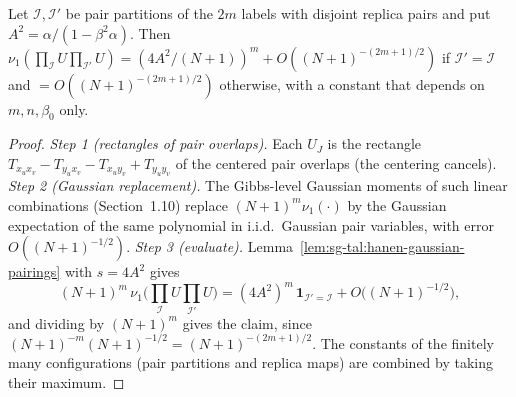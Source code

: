 \begin{lemma}\label{lem:sg-tal:hanen-full-pairings}
\leanok
{}
Let $\mathcal I,\mathcal I'$ be pair partitions of the $2m$ labels with disjoint replica pairs and put $A^2=\alpha/(1-\beta^2\alpha)$.
Then $\nu_1(\prod_{\mathcal I}U\prod_{\mathcal I'}U)=(4A^2/(N+1))^m+O((N+1)^{-(2m+1)/2})$ if $\mathcal I'=\mathcal I$ and
$=O((N+1)^{-(2m+1)/2})$ otherwise, with a constant that depends on $m,n,\beta_0$ only.
\end{lemma}
\begin{proof}
\leanok
\emph{Step 1 (rectangles of pair overlaps).} Each $U_J$ is the rectangle $T_{x_ux_v}-T_{y_ux_v}-T_{x_uy_v}+T_{y_uy_v}$ of the centered pair overlaps (the centering cancels).
\emph{Step 2 (Gaussian replacement).} The Gibbs-level Gaussian moments of such linear combinations (Section~1.10) replace $(N+1)^m\nu_1(\cdot)$ by the Gaussian expectation of the same polynomial in i.i.d.\ Gaussian pair variables, with error $O((N+1)^{-1/2})$.
\emph{Step 3 (evaluate).} Lemma~\ref{lem:sg-tal:hanen-gaussian-pairings} with $s=4A^2$ gives
\[
(N+1)^m\,\nu_1\Big(\prod_{\mathcal I}U\prod_{\mathcal I'}U\Big)=(4A^2)^m\,\mathbf 1_{\mathcal I'=\mathcal I}+O\big((N+1)^{-1/2}\big),
\]
and dividing by $(N+1)^m$ gives the claim, since $(N+1)^{-m}(N+1)^{-1/2}=(N+1)^{-(2m+1)/2}$. The constants of the finitely many configurations (pair partitions and replica maps) are combined by taking their maximum.
\end{proof}

